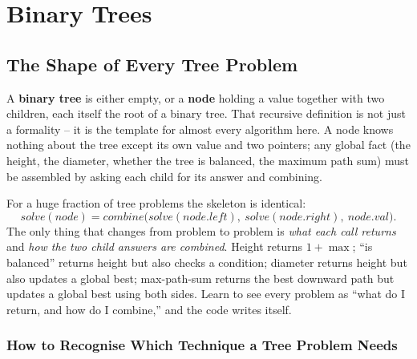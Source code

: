 \chapter{Binary Trees}

\section{The Shape of Every Tree Problem}
\label{sec:trees-intro}

A \textbf{binary tree} is either empty, or a \textbf{node} holding a value
together with two children, each itself the root of a binary tree. That
recursive definition is not just a formality -- it is the template for
almost every algorithm here. A node knows nothing about the tree except
its own value and two pointers; any global fact (the height, the diameter,
whether the tree is balanced, the maximum path sum) must be assembled by
asking each child for its answer and combining.

\begin{ideabox}
For a huge fraction of tree problems the skeleton is identical:
\[
  \textit{solve}(node) = \textit{combine}\big(\textit{solve}(node.left),\
  \textit{solve}(node.right),\ node.val\big).
\]
The only thing that changes from problem to problem is \emph{what each
call returns} and \emph{how the two child answers are combined}. Height
returns $1+\max$; ``is balanced'' returns height but also checks a
condition; diameter returns height but also updates a global best;
max-path-sum returns the best downward path but updates a global best
using both sides. Learn to see every problem as ``what do I return, and
how do I combine,'' and the code writes itself.
\end{ideabox}

\subsection*{How to Recognise Which Technique a Tree Problem Needs}

